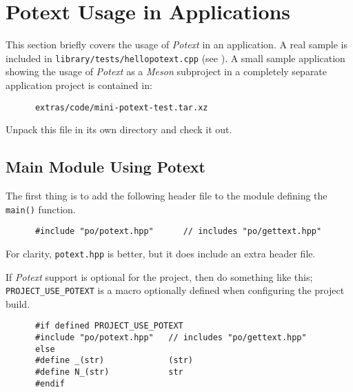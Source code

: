 %
%
%

\section{Potext Usage in Applications}
\label{subsec:potext_usage}

   This section briefly covers the usage of \textsl{Potext} in an
   application.
   A real sample is included in \texttt{library/tests/hellopotext.cpp}
   (see ).
   A small sample application showing the usage of
   \textsl{Potext} as a \textsl{Meson} subproject in a completely
   separate application project is
   contained in:

   \begin{verbatim}
      extras/code/mini-potext-test.tar.xz
   \end{verbatim}

   Unpack this file in its own directory and check it out.

\subsection{Main Module Using Potext}
\label{subsubsec:potext_usage_main}

   The first thing is to add the following header file
   to the module defining the \texttt{main()} function.

   \begin{verbatim}
      #include "po/potext.hpp"      // includes "po/gettext.hpp"
   \end{verbatim}

   For clarity, \texttt{potext.hpp} is better, but it does include
   an extra header file.

   If \textsl{Potext} support is optional for the project, then do
   something like this; \texttt{PROJECT\_USE\_POTEXT}
   is a macro optionally defined when configuring the project build.

   \begin{verbatim}
      #if defined PROJECT_USE_POTEXT
      #include "po/potext.hpp"   // includes "po/gettext.hpp"
      else
      #define _(str)             (str)
      #define N_(str)            str
      #endif
   \end{verbatim}

